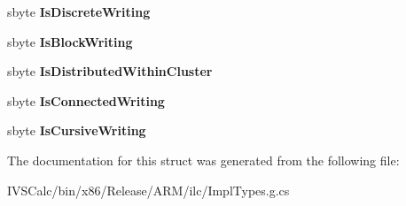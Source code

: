\begin{DoxyCompactItemize}
sbyte {\bfseries Is\+Discrete\+Writing}
\item 
\mbox{\label{struct_microsoft_1_1_graphics_1_1_canvas_1_1_text_1_1_canvas_script_properties_____impl_1_1_unsafe_type_a2196eb370ece2d6762795614b22804c2}} 
sbyte {\bfseries Is\+Block\+Writing}
\item 
\mbox{\label{struct_microsoft_1_1_graphics_1_1_canvas_1_1_text_1_1_canvas_script_properties_____impl_1_1_unsafe_type_ab0879dfc152f72f7edb38677daaf16fb}} 
sbyte {\bfseries Is\+Distributed\+Within\+Cluster}
\item 
\mbox{\label{struct_microsoft_1_1_graphics_1_1_canvas_1_1_text_1_1_canvas_script_properties_____impl_1_1_unsafe_type_a5e5d83744d0c711e8d71195c181548ff}} 
sbyte {\bfseries Is\+Connected\+Writing}
\item 
\mbox{\label{struct_microsoft_1_1_graphics_1_1_canvas_1_1_text_1_1_canvas_script_properties_____impl_1_1_unsafe_type_ab76b91e7c9bf50a76bdbaf2d1cb18cfd}} 
sbyte {\bfseries Is\+Cursive\+Writing}
\end{DoxyCompactItemize}


The documentation for this struct was generated from the following file\+:\begin{DoxyCompactItemize}
\item 
I\+V\+S\+Calc/bin/x86/\+Release/\+A\+R\+M/ilc/Impl\+Types.\+g.\+cs\end{DoxyCompactItemize}
